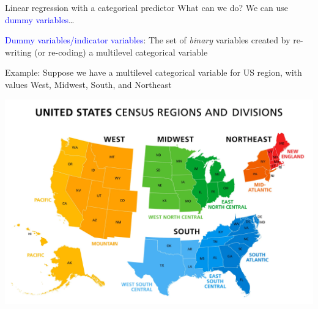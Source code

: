 \documentclass[10pt,t]{beamer}
\begin{document}
\begin{frame}{Linear regression with a categorical predictor}
What can we do? \pause We can use \textcolor{blue}{dummy variables}\dots

\vspace{0.3cm}

\textcolor{blue}{Dummy variables/indicator variables}: The set of \textit{binary} variables created by re-writing (or re-coding) a multilevel categorical variable  \pause

\vspace{0.3cm}

Example: Suppose we have a multilevel categorical variable for US region, with values West, Midwest, South, and Northeast

\vspace{0.1cm}

\centering

\includegraphics[scale=0.06]{figures/us_regions.png}

\end{frame}
\end{document}
